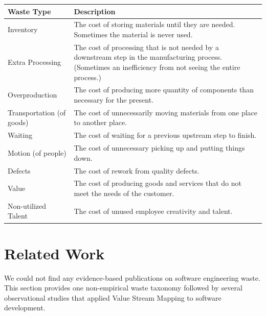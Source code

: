 \begin{table}[t]
\begin{tabular}{|p{2in}|p{4in}|}
Waste Type                & Description                                                                                                                                                  \\ \hline
Inventory                 & The cost of storing materials until they are needed. Sometimes the material is never used.                                                                   \\ \hline
Extra Processing          & The cost of processing that is not needed by a downstream step in the manufacturing process. (Sometimes an inefficiency from not seeing the entire process.) \\ \hline
Overproduction            & The cost of producing more quantity of components than necessary for the present.                                                                            \\ \hline
Transportation (of goods) & The cost of unnecessarily moving materials from one place to another place.                                                                                  \\ \hline
Waiting                   & The cost of waiting for a previous upstream step to finish.                                                                                                       \\ \hline
Motion (of people)        & The cost of unnecessary picking up and putting things down.                                                                                                  \\ \hline
Defects                   & The cost of rework from quality defects.                                                                                                                     \\ \hline
Value                     & The cost of producing goods and services that do not meet the needs of the customer.                                                                         \\ \hline
Non-utilized Talent       & The cost of unused employee creativity and talent.                                                                                                           \\ \hline
\end{tabular}
\end{table}

\section{Related Work}
\label{RelatedWork}
We could not find any evidence-based publications on software engineering waste. This section provides one non-empirical waste taxonomy followed by several observational studies that applied Value Stream Mapping to software development.


